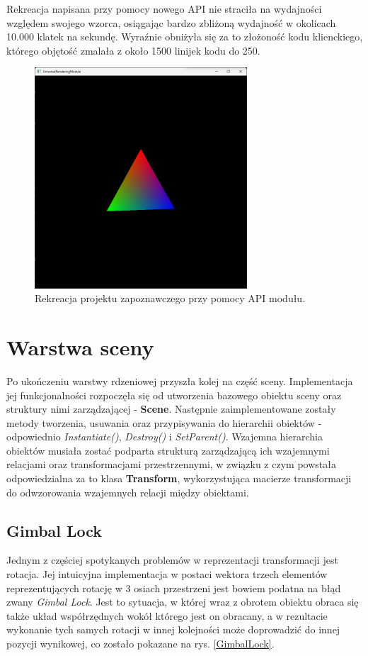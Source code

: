Rekreacja napisana przy pomocy nowego API nie straciła na wydajności względem swojego wzorca, osiągając bardzo zbliżoną wydajność w okolicach 10.000 klatek na sekundę. Wyraźnie obniżyła się za to złożoność kodu klienckiego, którego objętość zmalała z około 1500 linijek kodu do 250. 

\begin{figure}[h!]
	\centering
	\includegraphics[width=300px]{images/impl/2_rotating_triangle.png}
	\caption{Rekreacja projektu zapoznawczego przy pomocy API modułu.}
	\label{Impl_RotatingTriangle}
\end{figure}

\vfill

\section{Warstwa sceny}
Po ukończeniu warstwy rdzeniowej przyszła kolej na część sceny. Implementacja jej funkcjonalności rozpoczęła się od utworzenia bazowego obiektu sceny oraz struktury nimi zarządzającej - \textbf{Scene}. Następnie zaimplementowane zostały metody tworzenia, usuwania oraz przypisywania do hierarchii obiektów - odpowiednio \textit{Instantiate()}, \textit{Destroy()} i \textit{SetParent()}. Wzajemna hierarchia obiektów musiała zostać podparta strukturą zarządzającą ich wzajemnymi relacjami oraz transformacjami przestrzennymi, w związku z czym powstała odpowiedzialna za to klasa \textbf{Transform}, wykorzystująca macierze transformacji do odwzorowania wzajemnych relacji między obiektami.

\subsection{Gimbal Lock}
Jednym z częściej spotykanych problemów w reprezentacji transformacji jest rotacja. Jej intuicyjna implementacja w postaci wektora trzech elementów reprezentujących rotację w 3 osiach przestrzeni jest bowiem podatna na błąd zwany \textit{Gimbal Lock}. Jest to sytuacja, w której wraz z obrotem obiektu obraca się także układ współrzędnych wokół którego jest on obracany, a w rezultacie wykonanie tych samych rotacji w innej kolejności może doprowadzić do innej pozycji wynikowej, co zostało pokazane na rys. \ref{GimbalLock}.

